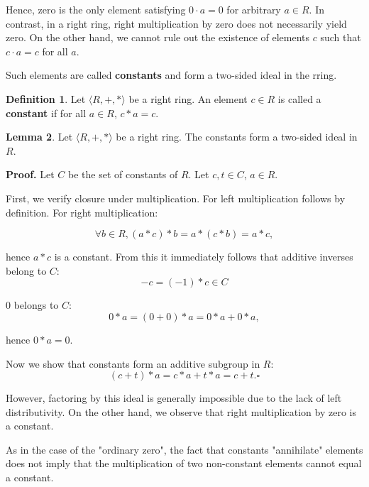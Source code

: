 \documentclass[12pt]{article}
\theoremstyle{definition}
\newtheorem{definition}{Definition}[section]
\newtheorem{lemma}[definition]{Lemma}
\begin{document}
Hence, zero is the only element satisfying $0 \cdot a = 0$ for arbitrary $a \in R$. 
In contrast, in a right ring, right multiplication by zero does not necessarily yield zero. On the other hand, we cannot rule out the existence of elements $c$ such that $c \cdot a = c$ for all $a$. 

Such elements are called \textbf{constants} and form a two-sided ideal in the rring. 

\begin{definition} Let $\langle R, +, * \rangle$ be a right ring. An element $c \in R$ is called a \textbf{constant} if for all $a \in R$, $c * a = c$.
\end{definition}

\vspace{5pt}
\begin{lemma} Let $\langle R, +, * \rangle$ be a right ring. The constants form a two-sided ideal in $R$.

\vspace{10pt}
\noindent\textbf{Proof.} Let $C$ be the set of constants of $R$. Let $c, t \in C$, $a \in R$.

First, we verify closure under multiplication. For left multiplication follows by definition. For right multiplication:

\[
\forall b \in R, (a * c) * b = a * (c * b) = a * c,
\]

hence $a * c$ is a constant.
\vspace{10pt}
From this it immediately follows that additive inverses belong to $C$:
\[
-c = (-1) * c \in C
\]

\vspace{10pt}
\noindent $0$ belongs to $C$:
\[
0 * a = (0 + 0) * a = 0 * a + 0 * a,
\]

hence $0 * a = 0$.

\vspace{10pt}
\noindent Now we show that constants form an additive subgroup in $R$:
\[
(c + t) * a = c * a + t * a = c + t. \square
\]
\end{lemma}

\vspace{10pt}
However, factoring by this ideal is generally impossible due to the lack of left distributivity. On the other hand, we observe that right multiplication by zero is a constant.

\vspace{10pt}
\noindent As in the case of the "ordinary zero", the fact that constants "annihilate" elements does not imply that 
the multiplication of two non-constant elements cannot equal a constant.
\end{document}
